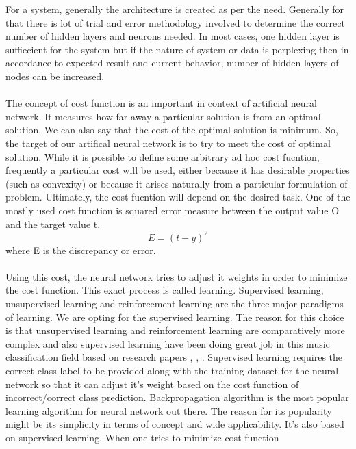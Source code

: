 {For a system, generally the architecture is created as per the need. Generally for that there is lot of trial and error methodology involved
to determine the correct number of hidden layers and neurons needed. In most cases, one hidden layer is suffiecient for the system but if 
the nature of system or data is perplexing then in accordance to expected result and current behavior, number of hidden layers of nodes can be increased.\\
\\
The concept of cost function is an important in context of artificial neural network. It measures how far away a particular solution is from an
optimal solution. We can also say that the cost of the optimal solution is minimum. So, the target of our artifical neural network is to
try to meet the cost of optimal solution. While it is possible to define some arbitrary ad hoc cost fucntion, frequently a particular cost will be used, either
because it has desirable properties (such as convexity) or because it arises naturally from a particular formulation of problem. Ultimately, the cost
fucntion will depend on the desired task. One of the mostly used cost function is squared error measure between the output value O and the target value t.
\begin{equation}
        E = (t-y)^2
\end{equation}
where E is the discrepancy or error.\\
\\
Using this cost, the neural network tries to adjust it weights in order to minimize the cost function. This exact process is called learning.
Supervised learning, unsupervised learning and reinforcement learning are the three major paradigms of learning. We are opting for the supervised learning.
The reason for this choice is that unsupervised learning and reinforcement learning are comparatively more complex and also supervised learning have been doing 
great job in this music classification field based on research papers \cite{Neumayer2004}, \cite{Haggblade2011}, \cite{Kour2015}. Supervised learning 
requires the correct class label to be provided along with the training dataset for the neural network so that it can adjust it's weight based on the cost function 
of incorrect/correct class prediction. Backpropagation algorithm is the most popular learning algorithm for neural network out there. The reason for
its popularity might be its simplicity in terms of concept and wide applicability. It's also based on supervised learning. When one tries to minimize cost function
}
